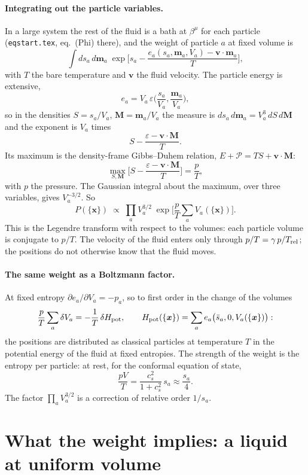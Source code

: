 \documentclass[11pt,aps,preprint,nofootinbib,superscriptaddress,tightenlines]{revtex4-2}
\def\st{\begin{equation}}
\def\stp{\end{equation}}
\let\oldparagraph\paragraph
\renewcommand{\paragraph}{\par\bigskip\oldparagraph}
\begin{document}
\paragraph{Integrating out the particle variables.}  In a large system the rest of the fluid is a bath at
$\beta^\mu$ for each particle (\texttt{eqstart.tex}, eq.~(Phi) there), and the weight of particle $a$ at fixed volume is
\st
\int ds_a\,d\bm m_a\;\exp\Big[s_a-\frac{e_a(s_a,\bm m_a,V_a)-\bm v\cdot\bm m_a}{T}\Big] ,
\label{single}
\stp
with $T$ the bare temperature and $\bm v$ the fluid velocity.  The particle energy is extensive,
\st
e_a=V_a\,\varepsilon\Big(\frac{s_a}{V_a},\frac{\bm m_a}{V_a}\Big),
\stp
so in the densities $S=s_a/V_a$, $\bm M=\bm m_a/V_a$ the measure is $ds_a\,d\bm m_a=V_a^3\,dS\,d\bm M$ and the exponent is $V_a$ times
\st
S-\frac{\varepsilon-\bm v\cdot\bm M}{T} .
\stp
Its maximum is the density-frame Gibbs--Duhem relation, $E+\mathcal P=TS+\bm v\cdot\bm M$:
\st
\max_{S,\bm M}\Big[S-\frac{\varepsilon-\bm v\cdot\bm M}{T}\Big]=\frac{p}{T} ,
\stp
with $p$ the pressure.  The Gaussian integral about the maximum, over three variables, gives $V_a^{-3/2}$.  So
\st
\boxed{\;P(\{\bm x\})\;\propto\;\prod_aV_a^{3/2}\;\exp\Big[\frac pT\sum_aV_a(\{\bm x\})\Big] .\;}
\label{Px}
\stp
This is the Legendre transform with respect to the volumes: each particle volume is conjugate to $p/T$.  The
velocity of the fluid enters only through $p/T=\gamma\,p/T_{\rm rel}$; the positions do not otherwise know that the fluid
moves.

\paragraph{The same weight as a Boltzmann factor.}  At fixed entropy $\partial e_a/\partial V_a=-p_a$, so to first order in the
change of the volumes
\st
\frac pT\sum_a\delta V_a=-\frac1T\,\delta H_{\rm pot},\qquad H_{\rm pot}(\{\bm x\})=\sum_ae_a\big(\bar s_a,0,V_a(\{\bm x\})\big):
\stp
the positions are distributed as classical particles at temperature $T$ in the potential energy of the fluid at fixed
entropies.  The strength of the weight is the entropy per particle: at rest, for the conformal equation of state,
\st
\frac{pV}{T}=\frac{c_s^2}{1+c_s^2}\,s_a\approx\frac{s_a}4 .
\label{strength}
\stp
The factor $\prod_aV_a^{3/2}$ is a correction of relative order $1/s_a$.

\section{What the weight implies: a liquid at uniform volume}
\label{sec:liquid}
\end{document}

